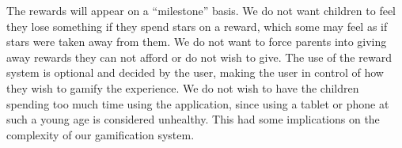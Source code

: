 The rewards will appear on a ``milestone'' basis. We do not want children to feel they lose something if they spend stars on a reward, which some may feel as if stars were taken away from them. We do not want to force parents into giving away rewards they can not afford or do not wish to give. The use of the reward system is optional and decided by the user, making the user in control of how they wish to gamify the experience. 
We do not wish to have the children spending too much time using the application, since using a tablet or phone at such a young age is considered unhealthy. This had some implications on the complexity of our gamification system. 

